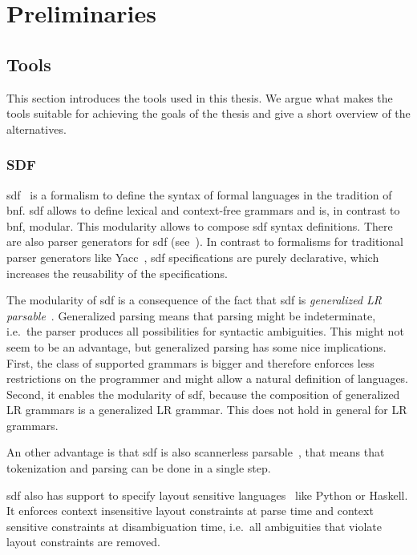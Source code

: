 \chapter{Preliminaries}
\section{Tools}
This section introduces the tools used in this thesis. We argue what
makes the tools suitable for achieving the goals of the thesis and
give a short overview of the alternatives.

\subsection{SDF}
\gls{sdf}~\cite{Heering:1989:SDF:71605.71607} is a formalism to define
the syntax of formal languages in the tradition of
\gls{bnf}. \gls{sdf} allows to define lexical and context-free
grammars and is, in contrast to \gls{bnf}, modular. This modularity
allows to compose \gls{sdf} syntax definitions. There are also parser
generators for \gls{sdf} (see~\cite{Rekers92parsergeneration}). In
contrast to formalisms for traditional parser generators like
Yacc~\cite{Johnson75yacc:yet}, \gls{sdf} specifications are purely
declarative, which increases the reusability of the specifications.

The modularity of \gls{sdf} is a consequence of the fact that
\gls{sdf} is \textit{generalized LR
  parsable}~\cite{Rekers92parsergeneration}. Generalized parsing means
that parsing might be indeterminate, i.e.\ the parser produces all
possibilities for syntactic ambiguities. This might not seem to be an
advantage, but generalized parsing has some nice implications. First,
the class of supported grammars is bigger and therefore enforces less
restrictions on the programmer and might allow a natural definition of
languages. Second, it enables the modularity of \gls{sdf}, because the
composition of generalized LR grammars is a generalized LR
grammar. This does not hold in general for LR grammars.

An other advantage is that \gls{sdf} is also scannerless
parsable~\cite{Brand02disambiguationfilters}, that means that
tokenization and parsing can be done in a single step.

\gls{sdf} also has support to specify layout sensitive
languages~\cite{conf/sle/ErdwegRKO12} like Python or Haskell. It
enforces context insensitive layout constraints at parse time and
context sensitive constraints at disambiguation time, i.e.\ all
ambiguities that violate layout constraints are removed.

